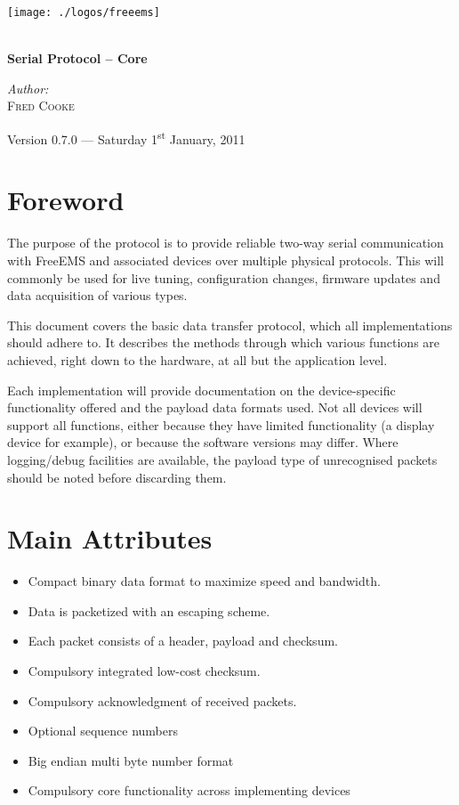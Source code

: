 \documentclass[12pt,a4paper,titlepage]{article}
\begin{document}
\begin{titlepage} 
\begin{center}

\texttt{[image: ./logos/freeems]}\\[1cm] \vfill

\HRule \\[0.8cm]
{ \huge \bfseries Serial Protocol -- Core}\\[0.4cm]
\HRule \vfill

\Large \emph{Author:}\\
\textsc{Fred Cooke} \vfill

{\large Version 0.7.0 --- Saturday 1\textsuperscript{st} January, 2011}

\end{center}
\end{titlepage} 





\section{Foreword}

The purpose of the protocol is to provide reliable two-way serial communication
with FreeEMS and associated devices over multiple physical protocols. This will
commonly be used for live tuning, configuration changes, firmware updates and
data acquisition of various types.

This document covers the basic data transfer protocol, which all
implementations should adhere to. It describes the methods through which
various functions are achieved, right down to the hardware, at all but the
application level.

Each implementation will provide documentation on the device-specific
functionality offered and the payload data formats used. Not all devices
will support all functions, either because they have limited functionality
(a display device for example), or because the software versions may differ.
Where logging/debug facilities are available, the payload type of unrecognised
packets should be noted before discarding them.




\section{Main Attributes}
\begin{itemize}
\item Compact binary data format to maximize speed and bandwidth.
\item Data is packetized with an escaping scheme.
\item Each packet consists of a header, payload and checksum.
\item Compulsory integrated low-cost checksum.
\item Compulsory acknowledgment of received packets.
\item Optional sequence numbers
\item Big endian multi byte number format
\item Compulsory core functionality across implementing devices
\end{itemize}
\end{document}
